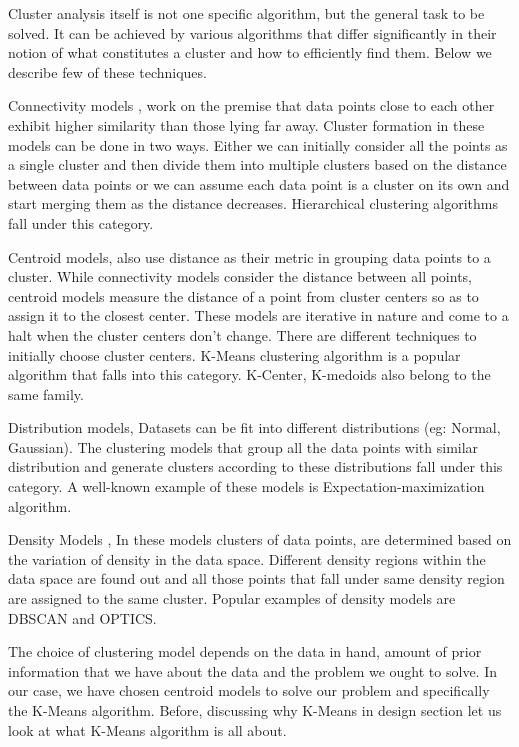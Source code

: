  Cluster analysis itself is not one specific algorithm, but the general task to be solved. It can be achieved by various algorithms that differ significantly in their notion of what constitutes a cluster and how to efficiently find them. Below we describe few of these techniques.

Connectivity models \cite{doi:10.1093/comjnl/26.4.354}, work on the premise that data points close to each other exhibit higher similarity than those lying far away. Cluster formation in these models can be done in two ways. Either we can initially consider all the points as a single cluster and then divide them into multiple clusters based on the distance between data points or we can assume each data point is a cluster on its own and start merging them as the distance decreases. Hierarchical clustering algorithms fall under this category.

Centroid models, also use distance as their metric in grouping data points to a cluster. While connectivity models consider the distance between all points, centroid models measure the distance of a point from cluster centers so as to assign it to the closest center. These models are iterative in nature and come to a halt when the cluster centers don't change. There are different techniques to initially choose cluster centers.  K-Means clustering algorithm \cite{Derpanis06k-meansclustering} is a popular algorithm that falls into this category. K-Center, K-medoids also belong to the same family.
 
Distribution models\cite{Johnson2000}, Datasets can be fit into different distributions (eg: Normal, Gaussian). The clustering models that group all the data points with similar distribution and generate clusters according to these distributions fall under this category. A well-known example of these models is Expectation-maximization algorithm. 

Density Models \cite{thang2011anomaly}, In these models clusters of data points, are determined based on the variation of density in the data space. Different density regions within the data space are found out and all those points that fall under same density region are assigned to the same cluster. Popular examples of density models are DBSCAN and OPTICS.

The choice of clustering model depends on the data in hand, amount of prior information that we have about the data and the problem we ought to solve. In our case, we have chosen centroid models to solve our problem and specifically the K-Means algorithm. Before, discussing why K-Means in design section let us look at what K-Means algorithm is all about.

